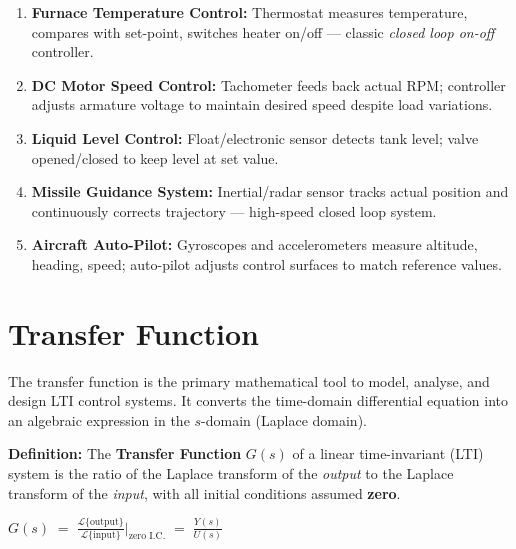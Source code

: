 \documentclass[12pt,a4paper]{article}
\begin{document}
\begin{tcolorbox}[examplebox]
\begin{enumerate}[label=\textbf{\arabic*.}, leftmargin=*, itemsep=4pt, topsep=0pt]
  \item \textbf{Furnace Temperature Control:} Thermostat measures temperature, compares with set-point, switches heater on/off — classic \textit{closed loop on-off} controller.
  \item \textbf{DC Motor Speed Control:} Tachometer feeds back actual RPM; controller adjusts armature voltage to maintain desired speed despite load variations.
  \item \textbf{Liquid Level Control:} Float/electronic sensor detects tank level; valve opened/closed to keep level at set value.
  \item \textbf{Missile Guidance System:} Inertial/radar sensor tracks actual position and continuously corrects trajectory — high-speed closed loop system.
  \item \textbf{Aircraft Auto-Pilot:} Gyroscopes and accelerometers measure altitude, heading, speed; auto-pilot adjusts control surfaces to match reference values.
\end{enumerate}
\end{tcolorbox}

\section{Transfer Function}

The transfer function is the primary mathematical tool to model, analyse, and design LTI control systems. It converts the time-domain differential equation into an algebraic expression in the $s$-domain (Laplace domain).

\begin{tcolorbox}[defbox]
\textbf{Definition:} The \textbf{Transfer Function} $G(s)$ of a linear time-invariant (LTI) system is the ratio of the Laplace transform of the \textit{output} to the Laplace transform of the \textit{input}, with all initial conditions assumed \textbf{zero}.
\end{tcolorbox}

\begin{tcolorbox}[formulabox]
\centering
$\displaystyle G(s) \;=\; \frac{\mathcal{L}\{\text{output}\}}{\mathcal{L}\{\text{input}\}}\bigg|_{\text{zero I.C.}} \;=\; \frac{Y(s)}{U(s)}$
\end{tcolorbox}
\end{document}
